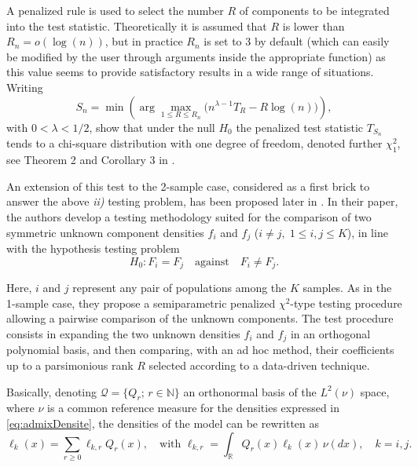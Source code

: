 A penalized rule is used to select the number \(R\) of components to be integrated into the test statistic. Theoretically it is assumed that \(R\) is lower than \(R_n=o(\log(n))\), but in practice \(R_n\) is set to 3 by default (which can easily be modified by the user through arguments inside the appropriate function) as this value seems to provide satisfactory results in a wide range of situations. Writing
\[
S_n = \min \left( \arg\max_{1 \leq R \leq R_n} \big( n^{\lambda-1} T_R - R \log(n) \big) \right),
\]
with \(0 < \lambda < 1/2\),
\citet{Pommeret+Vandekerkhove:2019} show that under the null \(H_0\) the penalized test statistic \(T_{S_n}\) tends to a chi-square distribution with one degree of freedom, denoted further \(\chi^2_1\), see Theorem 2 and Corollary 3 in \citet{Pommeret+Vandekerkhove:2019}.

An extension of this test to the 2-sample case, considered as a first brick to answer the above \emph{ii)} testing problem, has been proposed later in \citet{Milhaud+Pommeret+Salhi+Vandekerkhove:2022}. In their paper, the authors develop a testing methodology suited for the comparison of two symmetric unknown component densities \(f_i\) and \(f_j\) (\(i \neq j, \; 1 \leq i,j \leq K\)), in line with the hypothesis testing problem
\begin{equation}
  H_0: F_i=F_j  \quad \text{against} \quad  F_i \neq F_j.
\label{eq:twoSample-test}
\end{equation}

Here, \(i\) and \(j\) represent any pair of populations among the \(K\) samples. As in the 1-sample case, they propose a semiparametric penalized \(\chi^2\)-type testing procedure allowing a pairwise comparison of the unknown components. The test procedure consists in expanding the two unknown densities \(f_i\) and \(f_j\) in an orthogonal polynomial basis, and then comparing, with an ad hoc method, their coefficients up to a parsimonious rank \(R\) selected according to a data-driven technique.

Basically, denoting \(\mathcal{Q} = \{Q_r; \, r \in \mathbb{N}\}\) an orthonormal basis of the \(L^2(\nu)\) space, where \(\nu\) is a common reference measure for the densities expressed in \eqref{eq:admixDensite}, the densities of the model can be rewritten as
\begin{equation}
  \ell_k(x) = \sum_{r \geq 0} \ell_{k,r} Q_r(x), \quad 
  \text{with } \ell_{k,r} = \int_{\mathbb{R}} Q_r(x) \ell_k(x) \, \nu(dx), \quad k=i,j.
\label{eq:densityDecomp}
\end{equation}

